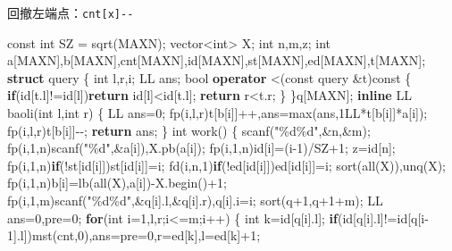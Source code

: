 \documentclass[
]{article}
\newenvironment{Shaded}{}{}
\newcommand{\AttributeTok}[1]{\textcolor[rgb]{0.49,0.56,0.16}{#1}}
\newcommand{\BuiltInTok}[1]{#1}
\newcommand{\ControlFlowTok}[1]{\textcolor[rgb]{0.00,0.44,0.13}{\textbf{#1}}}
\newcommand{\DataTypeTok}[1]{\textcolor[rgb]{0.56,0.13,0.00}{#1}}
\newcommand{\DecValTok}[1]{\textcolor[rgb]{0.25,0.63,0.44}{#1}}
\newcommand{\KeywordTok}[1]{\textcolor[rgb]{0.00,0.44,0.13}{\textbf{#1}}}
\newcommand{\NormalTok}[1]{#1}
\newcommand{\SpecialCharTok}[1]{\textcolor[rgb]{0.25,0.44,0.63}{#1}}
\newcommand{\StringTok}[1]{\textcolor[rgb]{0.25,0.44,0.63}{#1}}
\begin{document}
回撤左端点：\texttt{cnt{[}x{]}-\/-}

\begin{Shaded}
\begin{Highlighting}[]
\AttributeTok{const} \DataTypeTok{int}\NormalTok{ SZ = sqrt(MAXN);}
\NormalTok{vector\textless{}}\DataTypeTok{int}\NormalTok{\textgreater{} X;}
\DataTypeTok{int}\NormalTok{ n,m,z;}
\DataTypeTok{int}\NormalTok{ a[MAXN],b[MAXN],cnt[MAXN],id[MAXN],st[MAXN],ed[MAXN],t[MAXN];}
\KeywordTok{struct}\NormalTok{ query}
\NormalTok{\{}
    \DataTypeTok{int}\NormalTok{ l,r,i; LL ans;}
    \DataTypeTok{bool} \KeywordTok{operator}\NormalTok{ \textless{}(}\AttributeTok{const}\NormalTok{ query \&t)}\AttributeTok{const}
\NormalTok{    \{}
        \ControlFlowTok{if}\NormalTok{(id[t.l]!=id[l])}\ControlFlowTok{return}\NormalTok{ id[l]\textless{}id[t.l];}
        \ControlFlowTok{return}\NormalTok{ r\textless{}t.r;}
\NormalTok{    \}}
\NormalTok{\}q[MAXN];}
\KeywordTok{inline}\NormalTok{ LL baoli(}\DataTypeTok{int}\NormalTok{ l,}\DataTypeTok{int}\NormalTok{ r)}
\NormalTok{\{}
\NormalTok{    LL ans=}\DecValTok{0}\NormalTok{;}
\NormalTok{    fp(i,l,r)t[b[i]]++,ans=max(ans,}\DecValTok{1}\BuiltInTok{LL}\NormalTok{*t[b[i]]*a[i]);}
\NormalTok{    fp(i,l,r)t[b[i]]{-}{-};}
    \ControlFlowTok{return}\NormalTok{ ans;}
\NormalTok{\}}
\DataTypeTok{int}\NormalTok{ work()}
\NormalTok{\{}
\NormalTok{    scanf(}\StringTok{"}\SpecialCharTok{\%d\%d}\StringTok{"}\NormalTok{,\&n,\&m);}
\NormalTok{    fp(i,}\DecValTok{1}\NormalTok{,n)scanf(}\StringTok{"}\SpecialCharTok{\%d}\StringTok{"}\NormalTok{,\&a[i]),X.pb(a[i]);}
\NormalTok{    fp(i,}\DecValTok{1}\NormalTok{,n)id[i]=(i{-}}\DecValTok{1}\NormalTok{)/SZ+}\DecValTok{1}\NormalTok{; z=id[n];}
\NormalTok{    fp(i,}\DecValTok{1}\NormalTok{,n)}\ControlFlowTok{if}\NormalTok{(!st[id[i]])st[id[i]]=i;}
\NormalTok{    fd(i,n,}\DecValTok{1}\NormalTok{)}\ControlFlowTok{if}\NormalTok{(!ed[id[i]])ed[id[i]]=i;}
\NormalTok{    sort(all(X)),unq(X);}
\NormalTok{    fp(i,}\DecValTok{1}\NormalTok{,n)b[i]=lb(all(X),a[i]){-}X.begin()+}\DecValTok{1}\NormalTok{;}
\NormalTok{    fp(i,}\DecValTok{1}\NormalTok{,m)scanf(}\StringTok{"}\SpecialCharTok{\%d\%d}\StringTok{"}\NormalTok{,\&q[i].l,\&q[i].r),q[i].i=i;}
\NormalTok{    sort(q+}\DecValTok{1}\NormalTok{,q+}\DecValTok{1}\NormalTok{+m);}
\NormalTok{    LL ans=}\DecValTok{0}\NormalTok{,pre=}\DecValTok{0}\NormalTok{;}
    \ControlFlowTok{for}\NormalTok{(}\DataTypeTok{int}\NormalTok{ i=}\DecValTok{1}\NormalTok{,l,r;i\textless{}=m;i++)}
\NormalTok{    \{   }
        \DataTypeTok{int}\NormalTok{ k=id[q[i].l];}
        \ControlFlowTok{if}\NormalTok{(id[q[i].l]!=id[q[i{-}}\DecValTok{1}\NormalTok{].l])mst(cnt,}\DecValTok{0}\NormalTok{),ans=pre=}\DecValTok{0}\NormalTok{,r=ed[k],l=ed[k]+}\DecValTok{1}\NormalTok{;}

\end{Highlighting}
\end{Shaded}
\end{document}
